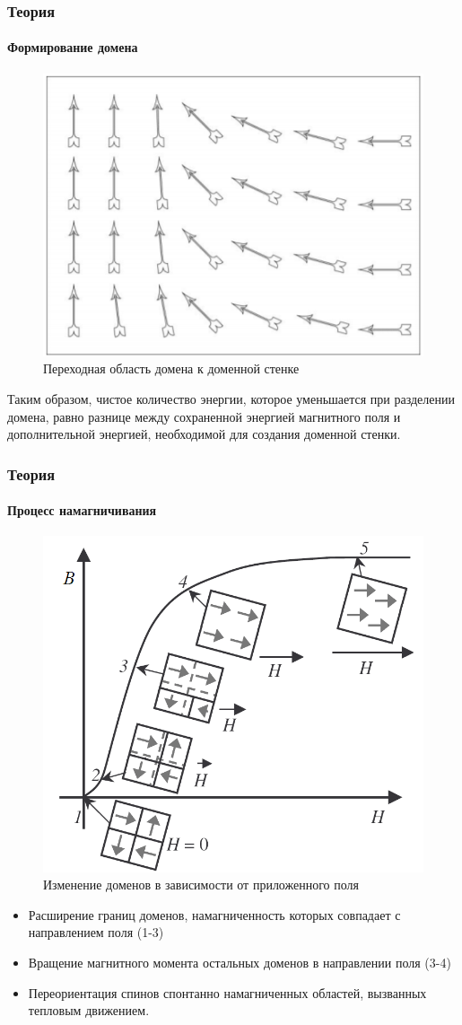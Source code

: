 \documentclass[8pt,pdf,hyperref={unicode}]{beamer}
\begin{document}
	\begin{frame}
		\frametitle{Теория}
		\framesubtitle{Формирование домена}
		\begin{center}
			\begin{figure}[h!]
				\centering
				\includegraphics[width=.5\linewidth]{Домены3.png}
				\caption{Переходная область домена к доменной стенке}
				\label{fig:3}
			\end{figure}
			Таким образом, чистое количество энергии, которое уменьшается при разделении домена, равно разнице между сохраненной энергией магнитного поля и дополнительной энергией, необходимой для создания доменной стенки.
		\end{center}
	\end{frame}
	
	\begin{frame}
		\frametitle{Теория}
		\framesubtitle{Процесс намагничивания}
		\begin{center}
			\begin{figure}[h!]
				\centering
				\includegraphics[width=.4\linewidth]{Домены5.png}
				\caption{Изменение доменов в зависимости от приложенного поля}
				\label{fig:3}
			\end{figure}
		\begin{itemize}
			\item Расширение границ доменов, намагниченность которых совпадает с направлением поля (1-3)
			\item Вращение магнитного момента остальных доменов в направлении поля (3-4)
			\item Переориентация спинов спонтанно намагниченных областей, вызванных тепловым движением.
		\end{itemize}
		\end{center}
	\end{frame}
\end{document}
